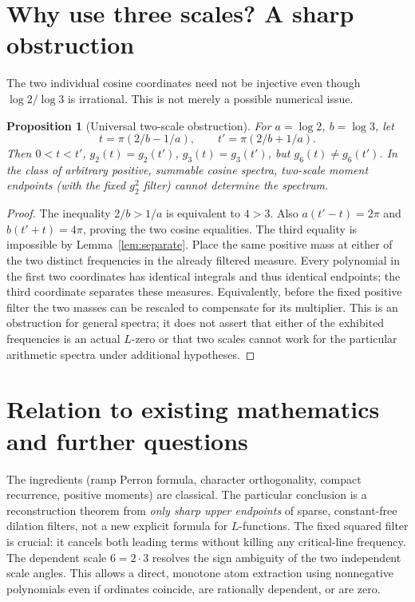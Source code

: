 \documentclass[11pt]{article}
\newtheorem{proposition}[theorem]{Proposition}
\theoremstyle{remark}\newtheorem{remark}[theorem]{Remark}
\begin{document}
\section{Why use three scales? A sharp obstruction}
The two individual cosine coordinates need not be injective even though $\log2/\log3$ is irrational. This is not merely a possible numerical issue.
\begin{proposition}[Universal two-scale obstruction]\label{prop:alias}
For $a=\log2$, $b=\log3$, let
\[
 t=\pi(2/b-1/a),\qquad t'=\pi(2/b+1/a).
\]
Then $0<t<t'$, $g_2(t)=g_2(t')$, $g_3(t)=g_3(t')$, but $g_6(t)\ne g_6(t')$. In the class of arbitrary positive, summable cosine spectra, two-scale moment endpoints (with the fixed $g_2^2$ filter) cannot determine the spectrum.
\end{proposition}
\begin{proof}
The inequality $2/b>1/a$ is equivalent to $4>3$. Also $a(t'-t)=2\pi$ and $b(t'+t)=4\pi$, proving the two cosine equalities. The third equality is impossible by Lemma~\ref{lem:separate}. Place the same positive mass at either of the two distinct frequencies in the already filtered measure. Every polynomial in the first two coordinates has identical integrals and thus identical endpoints; the third coordinate separates these measures. Equivalently, before the fixed positive filter the two masses can be rescaled to compensate for its multiplier. This is an obstruction for general spectra; it does not assert that either of the exhibited frequencies is an actual $L$-zero or that two scales cannot work for the particular arithmetic spectra under additional hypotheses.
\end{proof}

\section{Relation to existing mathematics and further questions}
The ingredients (ramp Perron formula, character orthogonality, compact recurrence, positive moments) are classical. The particular conclusion is a reconstruction theorem from \emph{only sharp upper endpoints} of sparse, constant-free dilation filters, not a new explicit formula for $L$-functions. The fixed squared filter is crucial: it cancels both leading terms without killing any critical-line frequency. The dependent scale $6=2\cdot3$ resolves the sign ambiguity of the two independent scale angles. This allows a direct, monotone atom extraction using nonnegative polynomials even if ordinates coincide, are rationally dependent, or are zero.
\end{document}
